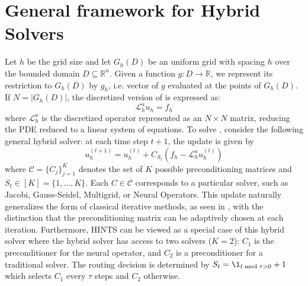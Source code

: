 \documentclass{article} %
\begin{document}
\section{General framework for Hybrid Solvers}


Let $h$ be the grid size and let $G_h(D)$ be an uniform grid with spacing $h$ over the bounded domain $D \subseteq \mathbb{R}^n$. Given a function $g: D \to \mathbb{R}$, we represent its restriction to $G_h(D)$ by $g_h$, i.e. vector of $g$ evaluated at the points of $G_h(D)$.
If $N = |G_h(D)|$, the discretized version of  is expressed as:
\begin{equation} \label{eq:mainpdediscrete}
    \mathcal{L}_h^au_h = f_h
\end{equation}
where $\mathcal{L}_h^a$ is the discretized operator represented as an $N \times N$ matrix, reducing the PDE reduced to a linear system of equations. To solve , consider the following general hybrid solver: at each time step $t + 1$, the update is given by
\begin{equation}
     u^{\left(t + 1\right)}_h = u^{\left(t\right)}_h + C_{S_t}\left(f_h - \mathcal{L}_h^au^{\left(t \right)}_h\right)
\end{equation}
where $\mathcal{C} =\{C_{j}\}_{j = 1}^K$ denotes the set of $K$ possible preconditioning matrices and $S_t \in [K] = \{1, \dots, K\}$. Each $C \in \mathcal{C}$ corresponds to a particular solver, such as Jacobi, Gauss-Seidel, Multigrid, or Neural Operators. This update naturally generalizes the form of classical iterative methods, as seen in , with the distinction that the preconditioning matrix can be adaptively chosen at each iteration. Furthermore, HINTS \citep{zhang2024blending} can be viewed as a special case of this hybrid solver where the hybrid solver has access to two solvers ($K = 2$):  $C_1$ is the preconditioner for the neural operator, and $C_2$ is a preconditioner for a traditional solver. The routing decision is determined by $S_t = \1_{t \bmod \tau > 0} + 1$ which selects $C_1$ every $\tau$ steps and $C_2$ otherwise.
\end{document}

